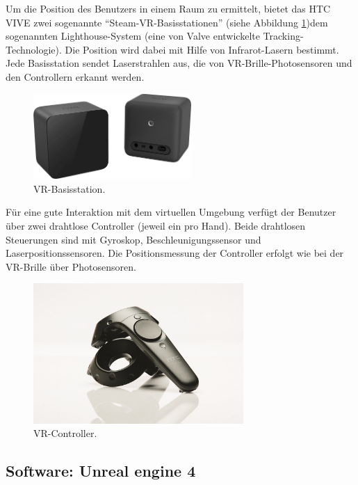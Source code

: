 Um die Position des Benutzers in einem Raum zu ermittelt, bietet das HTC VIVE zwei sogenannte ``Steam-VR-Basisstationen'' (siehe Abbildung \ref{vr-base})dem sogenannten Lighthouse-System (eine von Valve entwickelte Tracking-Technologie). 
Die Position wird dabei mit Hilfe von Infrarot-Lasern bestimmt. 
Jede Basisstation sendet Laserstrahlen aus, die von VR-Brille-Photosensoren und den Controllern erkannt werden. \\


\begin{figure}[h] \centering
\includegraphics[width=6cm]{Images/vr-base.png} 
\caption[VR-Basisstation]{ VR-Basisstation\cite{vive19}. }
\label{vr-base} 
\end{figure}


Für eine gute Interaktion mit dem virtuellen Umgebung verfügt der Benutzer über zwei  drahtlose Controller (jeweil ein pro Hand). 
Beide drahtlosen Steuerungen sind mit Gyroskop, Beschleunigungssensor und Laserpositionssensoren. 
Die Positionsmessung der Controller erfolgt wie bei der VR-Brille über  Photosensoren. \\


\begin{figure}[h] \centering
\includegraphics[width=8cm]{Images/vr-controller.png} 
\caption[VR-Controller]{ VR-Controller\cite{vive19}. }
\label{vr-controller} 
\end{figure}




\subsection{Software: Unreal engine 4} \label{vr-software}

